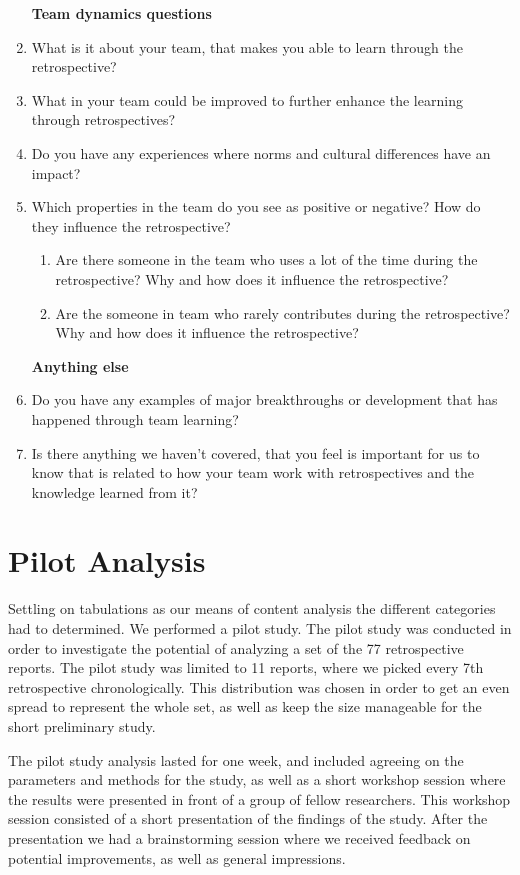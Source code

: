 \begin{enumerate}
\begin{center} 
	\textbf{Team dynamics questions}
\end{center}
\item What is it about your team, that makes you able to learn through the retrospective?
\item What in your team could be improved to further enhance the learning through retrospectives?
\item Do you have any experiences where norms and cultural differences have an impact?
\item Which properties in the team do you see as positive or negative? How do they influence the retrospective?
\begin{enumerate}
	\item Are there someone in the team who uses a lot of the time during the retrospective? Why and how does it influence the retrospective?
	\item Are the someone in team who rarely contributes during the retrospective? Why and how does it influence the retrospective?\\
\end{enumerate}

\begin{center} 
	\textbf{Anything else}
\end{center}
\item Do you have any examples of major breakthroughs or development that has happened through team learning?
\item Is there anything we haven’t covered, that you feel is important for us to know that is related to how your team work with retrospectives and the knowledge learned from it?
\end{enumerate}

\chapter{Pilot Analysis}
\label{pilot-analysis}
Settling on tabulations as our means of content analysis the different categories had to determined. We performed a pilot study.
The pilot study was conducted in order to investigate the potential of analyzing a set of the 77 retrospective reports.  The pilot study was limited to 11 reports, where we picked every 7th retrospective chronologically. This distribution was chosen in order to get an even spread to represent the whole set, as well as keep the size manageable for the short preliminary study.

The pilot study analysis lasted for one week, and included agreeing on the parameters and methods for the study, as well as a short workshop session where the results were presented in front of a group of fellow researchers. This workshop session consisted of a short presentation of the findings of the study. After the presentation we had a brainstorming session where we received feedback on potential improvements, as well as general impressions. 

